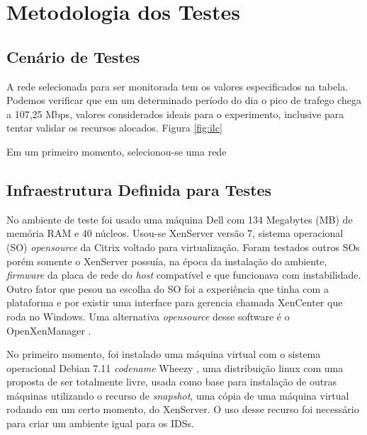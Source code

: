 \documentclass[
	12pt,				
	openright,		
	twoside,	
	a4paper,
	english,	
	brazil	
	]{abntex2}
\begin{document}
 \section{Metodologia dos Testes}
 \subsection{Cenário de Testes} \label{sec:cenário}

 A rede selecionada para ser monitorada tem os valores especificados na tabela. Podemos verificar que em um determinado período do dia o pico de trafego chega a 107,25 Mbps, valores considerados ideais para o experimento, inclusive para tentar validar os recursos alocados. Figura \ref{fig:ilc}

 Em um primeiro momento, selecionou-se uma rede

 \subsection{Infraestrutura Definida para Testes} \label{sec:infraestrutura}

 No ambiente de teste foi usado uma máquina Dell com 134 Megabytes (MB) de memória RAM e 40 núcleos. Usou-se XenServer \cite{xenserver} versão 7, sistema operacional (SO) \textit{opensource} da Citrix voltado para virtualização. Foram testados outros SOs porém somente o XenServer possuía, na época da instalação do ambiente, \textit{firmware} da placa de rede do \textit{host} compatível e que funcionava com instabilidade. Outro fator que pesou na escolha do SO foi a experiência que tinha com a plataforma e por existir uma interface para gerencia chamada XenCenter que roda no Windows. Uma alternativa \textit{opensource} desse software é o OpenXenManager \cite{openxenmanager}.

 No primeiro momento, foi instalado uma máquina virtual com o sistema operacional Debian 7.11 \textit{codename} Wheezy \cite{debianwheezy}, uma distribuição linux com uma proposta de ser totalmente livre, usada como base para instalação de outras máquinas utilizando o recurso de \textit{snapshot}, uma cópia de uma máquina virtual rodando em um certo momento, do XenServer. O uso desse recurso foi necessário para criar um ambiente igual para os IDSs.
\end{document}
